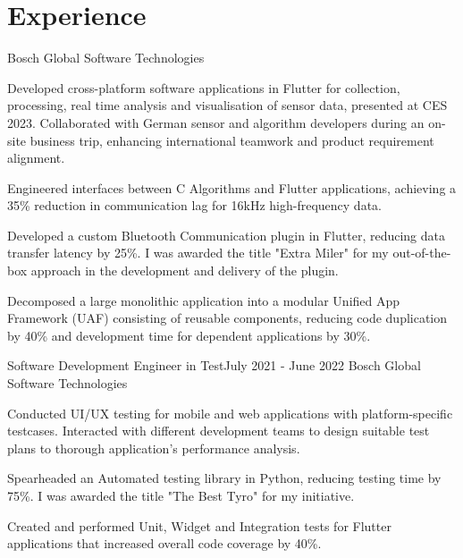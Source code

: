 \vspace{-5pt}
\section{Experience}
\resumeSubHeadingListStart
    {Bosch Global Software Technologies}{}
    \resumeItemListStart
          {
\item Developed cross-platform software applications in Flutter for collection, processing, real time analysis and visualisation of sensor data, presented at CES 2023. Collaborated with German sensor and algorithm developers during an on-site business trip, enhancing international teamwork and product requirement alignment.
  \item Engineered interfaces between C Algorithms and Flutter applications, achieving a 35\% reduction in communication lag for 16kHz high-frequency data.
  \item Developed a custom Bluetooth Communication plugin in Flutter, reducing data transfer latency by 25\%. I was awarded the title "Extra Miler" for my out-of-the-box approach in the development and delivery of the plugin.
  \item  Decomposed a large monolithic application into a modular Unified App Framework (UAF) consisting of reusable components, reducing code duplication by 40\% and development time for dependent applications by 30\%. 

}      \resumeItemListEnd
\vspace{-1pt}

    \resumeSubheading
		{Software Development Engineer in Test}{July 2021 - June 2022}
		{Bosch Global Software Technologies}{}
		\resumeItemListStart
        \item Conducted UI/UX testing for mobile and web applications with platform-specific testcases. Interacted with different development teams to design suitable test plans to thorough application's performance analysis.
        \item Spearheaded an Automated testing library in Python, reducing testing time by 75\%. I was awarded the title "The Best Tyro" for my initiative.
        \item Created and performed Unit, Widget and Integration tests for Flutter applications that increased overall code coverage by 40\%.
        
